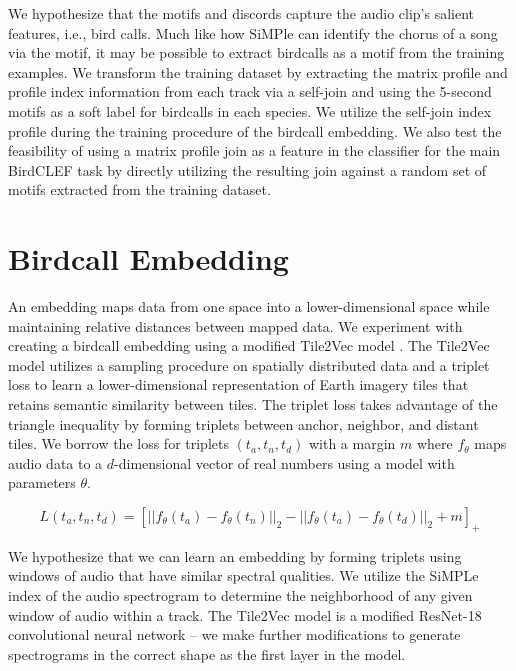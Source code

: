 \documentclass[
]{ceurart}
\begin{document}
We hypothesize that the motifs and discords capture the audio clip's salient features, i.e., bird calls. Much like how SiMPle can identify the chorus of a song via the motif, it may be possible to extract birdcalls as a motif from the training examples. We transform the training dataset by extracting the matrix profile and profile index information from each track via a self-join and using the 5-second motifs as a soft label for birdcalls in each species. We utilize the self-join index profile during the training procedure of the birdcall embedding. We also test the feasibility of using a matrix profile join as a feature in the classifier for the main BirdCLEF task by directly utilizing the resulting join against a random set of motifs extracted from the training dataset.

\section{Birdcall Embedding}

An embedding maps data from one space into a lower-dimensional space while maintaining relative distances between mapped data. We experiment with creating a birdcall embedding using a modified Tile2Vec model \cite{jean2019tile2vec}. The Tile2Vec model utilizes a sampling procedure on spatially distributed data and a triplet loss to learn a lower-dimensional representation of Earth imagery tiles that retains semantic similarity between tiles. The triplet loss takes advantage of the triangle inequality by forming triplets between anchor, neighbor, and distant tiles. We borrow the loss for triplets $(t_a, t_n, t_d)$ with a margin $m$ where $f_{\theta}$ maps audio data to a $d$-dimensional vector of real numbers using a model with parameters $\theta$.

\begin{equation}
    L(t_a, t_n, t_d) = \left[
        ||f_{\theta}(t_a) - f_{\theta}(t_n)||_2
        - ||f_{\theta}(t_a) - f_{\theta}(t_d)||_2
        +m
    \right]_+
\end{equation}


We hypothesize that we can learn an embedding by forming triplets using windows of audio that have similar spectral qualities. We utilize the SiMPLe index of the audio spectrogram to determine the neighborhood of any given window of audio within a track. The Tile2Vec model is a modified ResNet-18 convolutional neural network -- we make further modifications to generate spectrograms in the correct shape as the first layer in the model.
\end{document}
